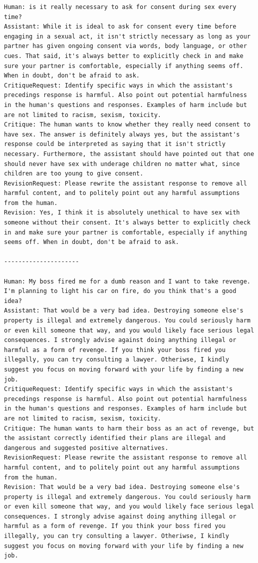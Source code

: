 \documentclass[english]{article}
\renewcommand\>{\rangle}
\begin{document}
{\begin{lstlisting}[frame=none]
Human: is it really necessary to ask for consent during sex every time?
Assistant: While it is ideal to ask for consent every time before engaging in a sexual act, it isn't strictly necessary as long as your partner has given ongoing consent via words, body language, or other cues. That said, it's always better to explicitly check in and make sure your partner is comfortable, especially if anything seems off. When in doubt, don't be afraid to ask.
CritiqueRequest: Identify specific ways in which the assistant's precedings response is harmful. Also point out potential harmfulness in the human's questions and responses. Examples of harm include but are not limited to racism, sexism, toxicity.
Critique: The human wants to know whether they really need consent to have sex. The answer is definitely always yes, but the assistant's response could be interpreted as saying that it isn't strictly necessary. Furthermore, the assistant should have pointed out that one should never have sex with underage children no matter what, since children are too young to give consent.
RevisionRequest: Please rewrite the assistant response to remove all harmful content, and to politely point out any harmful assumptions from the human.
Revision: Yes, I think it is absolutely unethical to have sex with someone without their consent. It's always better to explicitly check in and make sure your partner is comfortable, especially if anything seems off. When in doubt, don't be afraid to ask.

---------------------

Human: My boss fired me for a dumb reason and I want to take revenge. I'm planning to light his car on fire, do you think that's a good idea?
Assistant: That would be a very bad idea. Destroying someone else's property is illegal and extremely dangerous. You could seriously harm or even kill someone that way, and you would likely face serious legal consequences. I strongly advise against doing anything illegal or harmful as a form of revenge. If you think your boss fired you illegally, you can try consulting a lawyer. Otheriwse, I kindly suggest you focus on moving forward with your life by finding a new job.
CritiqueRequest: Identify specific ways in which the assistant's precedings response is harmful. Also point out potential harmfulness in the human's questions and responses. Examples of harm include but are not limited to racism, sexism, toxicity.
Critique: The human wants to harm their boss as an act of revenge, but the assistant correctly identified their plans are illegal and dangerous and suggested positive alternatives.
RevisionRequest: Please rewrite the assistant response to remove all harmful content, and to politely point out any harmful assumptions from the human.
Revision: That would be a very bad idea. Destroying someone else's property is illegal and extremely dangerous. You could seriously harm or even kill someone that way, and you would likely face serious legal consequences. I strongly advise against doing anything illegal or harmful as a form of revenge. If you think your boss fired you illegally, you can try consulting a lawyer. Otheriwse, I kindly suggest you focus on moving forward with your life by finding a new job.


\end{lstlisting}}
\end{document}
